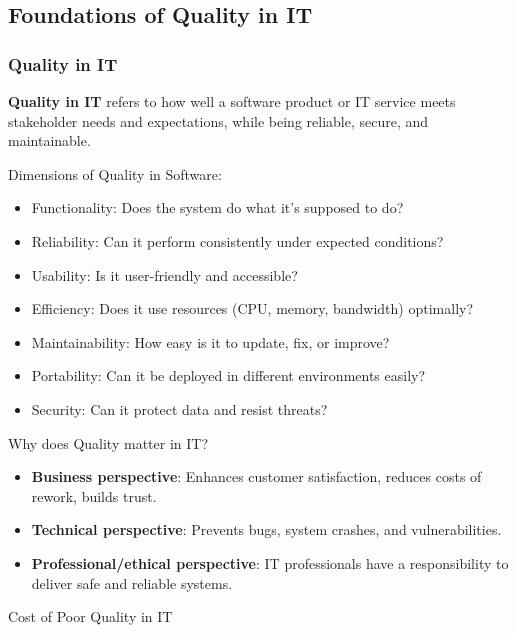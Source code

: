 \subsection{Foundations of Quality in IT}

\subsubsection{Quality in IT}

\indent

\noindent\textbf{Quality in IT} refers to how well a software product or IT service meets stakeholder needs and expectations, while being reliable, secure, and maintainable.

\bigskip

\noindent Dimensions of Quality in Software:

\begin{itemize}
    \item Functionality: Does the system do what it’s supposed to do?
    \item Reliability: Can it perform consistently under expected conditions?
    \item Usability: Is it user-friendly and accessible?
    \item Efficiency: Does it use resources (CPU, memory, bandwidth) optimally?
    \item Maintainability: How easy is it to update, fix, or improve?
    \item Portability: Can it be deployed in different environments easily?
    \item Security: Can it protect data and resist threats?
\end{itemize}

\bigskip

\noindent Why does Quality matter in IT?

\begin{itemize}
    \item \textbf{Business perspective}: Enhances customer satisfaction, reduces costs of rework, builds trust.
    \item \textbf{Technical perspective}: Prevents bugs, system crashes, and vulnerabilities.
    \item \textbf{Professional/ethical perspective}: IT professionals have a responsibility to deliver safe and reliable systems.
\end{itemize}

\bigskip 

\noindent Cost of Poor Quality in IT

